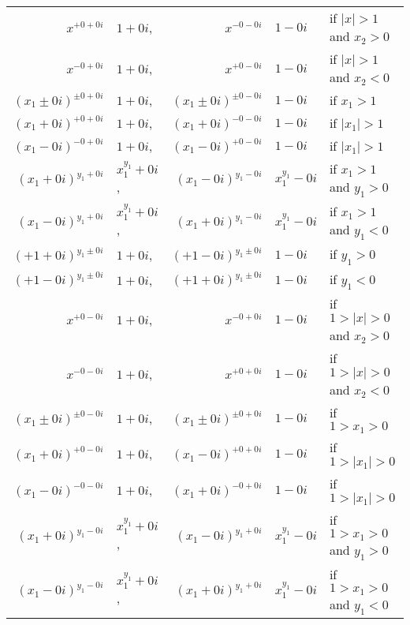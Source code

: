 \documentclass [12pt]{article}
\begin{document}
\begin{tabular}{r@{ $=$ }lr@{ $=$ }ll}
  $x^{+0 +0i}$ & $1 +0i$,&
  $x^{-0 -0i}$ & $1 -0i$ &
  if $|x|>1$ and $x_2>0$\\
  $x^{-0 +0i}$ & $1 +0i$,&
  $x^{+0 -0i}$ & $1 -0i$ &
  if $|x|>1$ and $x_2<0$\\

  $(x_1 \pm 0i)^{\pm0 +0i}$ & $1 +0i$,&
  $(x_1 \pm 0i)^{\pm0 -0i}$ & $1 -0i$ &
  if $x_1>1$\\

  $(x_1 +0i)^{+0 +0i}$ & $1 +0i$, &
  $(x_1 +0i)^{-0 -0i}$ & $1 -0i$ &
  if $|x_1|>1$\\
  $(x_1 -0i)^{-0 +0i}$ & $1 +0i$, &
  $(x_1 -0i)^{+0 -0i}$ & $1 -0i$ &
  if $|x_1|>1$\\

  $(x_1 +0i)^{y_1 +0i}$ & $x_1^{y_1} +0i$, &
  $(x_1 -0i)^{y_1 -0i}$ & $x_1^{y_1} -0i$ &
  if $x_1>1$ and $y_1>0$\\
  $(x_1 -0i)^{y_1 +0i}$ & $x_1^{y_1} +0i$, &
  $(x_1 +0i)^{y_1 -0i}$ & $x_1^{y_1} -0i$ &
  if $x_1>1$ and $y_1<0$\\

  $(+1 +0i)^{y_1 \pm0i}$ & $1 +0i$, &
  $(+1 -0i)^{y_1 \pm0i}$ & $1 -0i$ &
  if $y_1>0$\\
  $(+1 -0i)^{y_1 \pm0i}$ & $1 +0i$, &
  $(+1 +0i)^{y_1 \pm0i}$ & $1 -0i$ &
  if $y_1<0$\\

  $x^{+0 -0i}$ & $1 +0i$, &
  $x^{-0 +0i}$ & $1 -0i$ &
  if $1>|x|>0$ and $x_2>0$\\
  $x^{-0 -0i}$ & $1 +0i$, &
  $x^{+0 +0i}$ & $1 -0i$ &
  if $1>|x|>0$ and $x_2<0$\\

  $(x_1 \pm0i)^{\pm0 -0i}$ & $1 +0i$, &
  $(x_1 \pm0i)^{\pm0 +0i}$ & $1 -0i$ &
  if $1 > x_1 > 0$ \\

  $(x_1 +0i)^{+0 -0i}$ & $1 +0i$, &
  $(x_1 -0i)^{+0 +0i}$ & $1 -0i$ &
  if $1 > |x_1| > 0$ \\
  $(x_1 -0i)^{-0 -0i}$ & $1 +0i$, &
  $(x_1 +0i)^{-0 +0i}$ & $1 -0i$ &
  if $1 > |x_1| > 0$ \\

  $(x_1 +0i)^{y_1 -0i}$ & $x_1^{y_1} +0i$, &
  $(x_1 -0i)^{y_1 +0i}$ & $x_1^{y_1} -0i$ &
  if $1 > x_1 > 0$ and $y_1 > 0$ \\
  $(x_1 -0i)^{y_1 -0i}$ & $x_1^{y_1} +0i$, &
  $(x_1 +0i)^{y_1 +0i}$ & $x_1^{y_1} -0i$ &
  if $1 > x_1 > 0$ and $y_1 < 0$ \\


\end{tabular}
\end{document}
